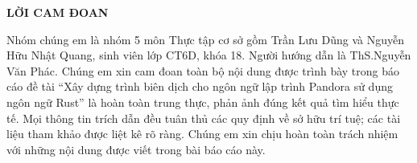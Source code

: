\begin{center}
    \bf{LỜI CAM ĐOAN}
\end{center}

Nhóm chúng em là nhóm 5 môn Thực tập cơ sở gồm Trần Lưu Dũng và Nguyễn Hữu Nhật Quang, sinh viên lớp CT6D, khóa 18. Người
hướng dẫn là ThS.Nguyễn Văn Phác. Chúng em xin cam đoan toàn bộ nội dung được trình
bày trong báo cáo đề tài “Xây dựng trình biên dịch cho ngôn ngữ lập
trình Pandora sử dụng ngôn ngữ Rust” là hoàn toàn trung
thực, phản ảnh đúng kết quả tìm hiểu thực tế. Mọi thông tin trích dẫn đều tuân thủ các
quy định về sở hữu trí tuệ; các tài liệu tham khảo được liệt kê rõ ràng. Chúng em xin
chịu hoàn toàn trách nhiệm với những nội dung được viết trong bài báo cáo này.
